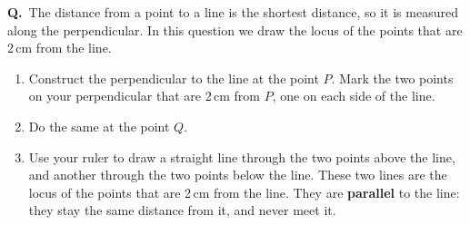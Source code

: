 \documentclass[12pt,a4paper]{article}
\newcounter{qn}
\newcommand{\q}{\refstepcounter{qn}\textbf{Q\theqn.}\ }
\newcommand{\pt}[3]{\fill #1 circle (1.5pt); \node[lab,#2] at #1 {$#3$};}
\newenvironment{diagram}{\par\vspace{8pt}\centering}{\par}
\begin{document}
\begin{diagram}
\end{diagram}

\vfill
\newpage


\q The distance from a point to a line is the shortest distance, so
it is measured along the perpendicular. In this question we draw the
locus of the points that are 2\,cm from the line.
\begin{enumerate}
  \item Construct the perpendicular to the line at the point $P$.
    Mark the two points on your perpendicular that are 2\,cm from $P$,
    one on each side of the line.
  \item Do the same at the point $Q$.
  \item Use your ruler to draw a straight line through the two points
    above the line, and another through the two points below the line.
    These two lines are the locus of the points that are 2\,cm from the
    line. They are \textbf{parallel} to the line: they stay the same
    distance from it, and never meet it.
\end{enumerate}

\begin{diagram}
\end{diagram}
\end{document}
